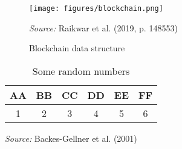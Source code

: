 






\begin{figure}[H]
    \centering
    \captionsetup{font=bf}
    \caption{Blockchain data structure} %
    \texttt{[image: figures/blockchain.png]} %
    \label{fig:myfigure} %
    \begin{tablenotes}
        \item \textit{Source:} Raikwar et al. (2019, p. 148553) %
    \end{tablenotes}
\end{figure}







\begin{table}[H]
    \centering
    \captionsetup{font=bf}
    \caption{Some random numbers} %
    \begin{tabular}{|c|c|c|c|c|c|} %
        \hline
        \textbf{AA} & \textbf{BB} & \textbf{CC} & \textbf{DD} & \textbf{EE} & \textbf{FF} \\ %
        \hline
        1 & 2 & 3 & 4 & 5 & 6 \\ %
        \hline
    \end{tabular}
    \label{tab:mytable}
    \begin{tablenotes}
        \centering
        \item \textit{Source:} Backes-Gellner et al. (2001) %
    \end{tablenotes}
\end{table}


